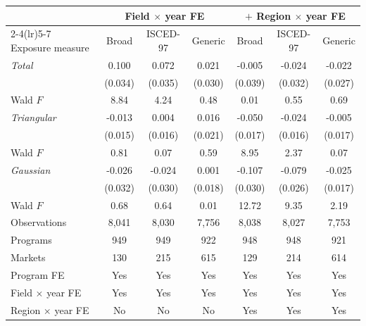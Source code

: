 \begin{tabular}{lcccccc}
\toprule
 & \multicolumn{3}{c}{Field \(\times\) year FE} & \multicolumn{3}{c}{\(+\) Region \(\times\) year FE} \\
\cmidrule(lr){2-4}\cmidrule(lr){5-7}
Exposure measure & Broad & ISCED-97 & Generic & Broad & ISCED-97 & Generic \\
\midrule
\textit{Total} &  0.100\sym{***} &  0.072\sym{**} &  0.021 & -0.005 & -0.024 & -0.022 \\
 & (0.034) & (0.035) & (0.030) & (0.039) & (0.032) & (0.027) \\
\quad Wald \(F\) &  8.84 &  4.24 &  0.48 &  0.01 &  0.55 &  0.69 \\
\addlinespace
\textit{Triangular} & -0.013 &  0.004 &  0.016 & -0.050\sym{***} & -0.024 & -0.005 \\
 & (0.015) & (0.016) & (0.021) & (0.017) & (0.016) & (0.017) \\
\quad Wald \(F\) &  0.81 &  0.07 &  0.59 &  8.95 &  2.37 &  0.07 \\
\addlinespace
\textit{Gaussian} & -0.026 & -0.024 &  0.001 & -0.107\sym{***} & -0.079\sym{***} & -0.025 \\
 & (0.032) & (0.030) & (0.018) & (0.030) & (0.026) & (0.017) \\
\quad Wald \(F\) &  0.68 &  0.64 &  0.01 & 12.72 &  9.35 &  2.19 \\
\midrule
Observations &     8,041 &     8,030 &     7,756 &     8,038 &     8,027 &     7,753 \\
Programs &       949 &       949 &       922 &       948 &       948 &       921 \\
Markets &       130 &       215 &       615 &       129 &       214 &       614 \\
Program FE & Yes & Yes & Yes & Yes & Yes & Yes \\
Field \(\times\) year FE & Yes & Yes & Yes & Yes & Yes & Yes \\
Region \(\times\) year FE & No & No & No & Yes & Yes & Yes \\
\bottomrule
\end{tabular}
